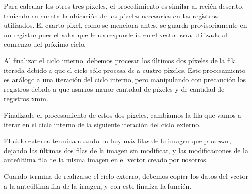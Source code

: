 Para calcular los otros tres píxeles, el procedimiento es similar al recién descrito, teniendo en cuenta la ubicación de los píxeles necesarios en los registros utilizados. El cuarto pixel, como se menciona antes, se guarda provisoriamente en un registro pues el valor que le correspondería en el vector sera utilizado al comienzo del próximo ciclo.

Al finalizar el ciclo interno, debemos procesar los últimos dos píxeles de la fila iterada debido a que el ciclo sólo procesa de a cuatro píxeles. Este procesamiento es análogo a una iteración del ciclo interno, pero manipulando con precaución los registros debido a que usamos menor cantidad de píxeles y de cantidad de registros xmm.

Finalizado el procesamiento de estos dos píxeles, cambiamos la fila que vamos a iterar en el ciclo interno de la siguiente iteración del ciclo externo.

El ciclo externo termina cuando no hay más filas de la imagen que procesar, dejando las últimas dos filas de la imagen sin modificar, y las modificaciones de la anteúltima fila de la misma imagen en el vector creado por nosotros.

Cuando termina de realizarse el ciclo externo, debemos copiar los datos del vector a la anteúltima fila de la imagen, y con esto finaliza la función.